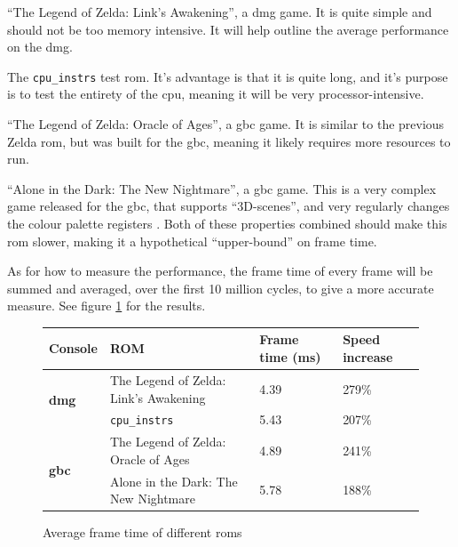 \documentclass[11pt]{informatics-report}
\begin{document}
\begin{compactitem}
	\item ``The Legend of Zelda: Link's Awakening'', a \gls{dmg} game. It is quite simple and should not be too memory intensive. It will help outline the average performance on the \gls{dmg}.
	\item The \texttt{cpu\_instrs} test \gls{rom}. It's advantage is that it is quite long, and it's purpose is to test the entirety of the \gls{cpu}, meaning it will be very processor-intensive.
	\item ``The Legend of Zelda: Oracle of Ages'', a \gls{gbc} game. It is similar to the previous Zelda \gls{rom}, but was built for the \gls{gbc}, meaning it likely requires more resources to run.
	\item ``Alone in the Dark: The New Nightmare'', a \gls{gbc} game. This is a very complex game released for the \gls{gbc}, that supports ``3D-scenes'', and very regularly changes the colour palette registers \cite[Tricky-to-emulate games]{gbdev_wiki}. Both of these properties combined should make this \gls{rom} slower, making it a hypothetical ``upper-bound'' on frame time.
\end{compactitem}

As for how to measure the performance, the frame time of every frame will be summed and averaged, over the first 10 million cycles, to give a more accurate measure. See figure \ref{fig:frame-time-results} for the results.


\begin{figure}[h]
    \centering
    \begin{tabular}{|l|l|l|l|}
    \hline
    \textbf{Console} & \textbf{ROM} & \textbf{Frame time} (ms) & \textbf{Speed increase} \\ \hline

	\multirow{2}{*}{\textbf{\gls{dmg}}}
	& The Legend of Zelda: Link's Awakening & 4.39 & 279\% \\\cline{2-4}
	& \texttt{cpu\_instrs} & 5.43 & 207\% \\\hline
	\multirow{2}{*}{\textbf{\gls{gbc}}}
	& The Legend of Zelda: Oracle of Ages & 4.89 & 241\% \\\cline{2-4}
	& Alone in the Dark: The New Nightmare & 5.78 & 188\% \\\hline

    \end{tabular}
    \caption{Average frame time of different \glspl{rom}}
    \label{fig:frame-time-results}
\end{figure}
\end{document}
